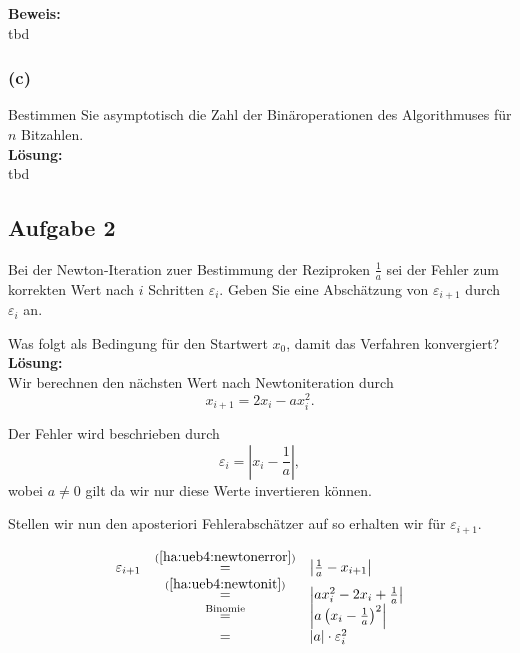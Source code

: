 \documentclass[11pt,a4paper,ngerman]{article}
\begin{document}
\textbf{Beweis:}\\

tbd

\subsubsection*{(c)}

Bestimmen Sie asymptotisch die Zahl der Binäroperationen des Algorithmuses für $n$ Bitzahlen.\\

\textbf{Lösung:}\\

tbd
\subsection*{Aufgabe 2}

Bei der Newton-Iteration zuer Bestimmung der Reziproken $\frac{1}{a}$ sei der Fehler zum korrekten Wert nach $i$ Schritten $\varepsilon_i$. Geben Sie eine Abschätzung von $\varepsilon_{i+1}$ durch $\varepsilon_i$ an.

Was folgt als Bedingung für den Startwert $x_0$, damit das Verfahren konvergiert?\\

\textbf{Lösung:}\\

Wir berechnen den nächsten Wert nach Newtoniteration durch
\begin{equation}\label{ha:ueb4:newtonit}
    x_{i+1} = 2x_i - ax_i^2.
\end{equation}

Der Fehler wird beschrieben durch
\begin{equation}\label{ha:ueb4:newtonerror}
    \varepsilon_i = \left| x_i - \frac{1}{a} \right|,
\end{equation} wobei $a \not= 0$ gilt da wir nur
diese Werte invertieren können.

Stellen wir nun den aposteriori Fehlerabschätzer auf so erhalten wir
für $\varepsilon_{i+1}$.

\begin{equation}\label{ha:ueb4:aposteriori}\begin{array}{rcl}
    \varepsilon_{i+1} &\stackrel{(\ref{ha:ueb4:newtonerror})}{=}&
        \left| \frac{1}{a} - x_{i+1} \right|\\
    &\stackrel{(\ref{ha:ueb4:newtonit})}{=}&
        \left| ax_i^2 - 2x_i + \frac{1}{a} \right|\\
    &\stackrel{\text{Binomie}}{=}&
        \left| a \left( x_i - \frac{1}{a} \right)^2 \right|\\
    &=& |a| \cdot \varepsilon_i^2
\end{array}\end{equation}
\end{document}
